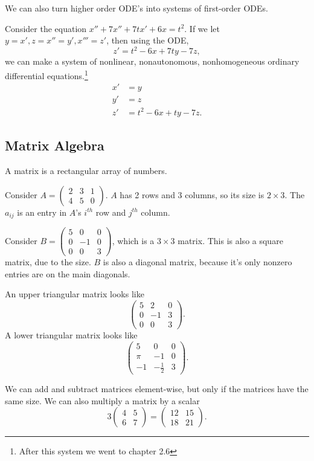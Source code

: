 We can also turn higher order ODE's into systems of first-order ODEs.
\begin{eg}
  Consider the equation $x''+7x''+7tx'+6x=t^2$. If we let $y=x',z=x''=y',x'''=z'$, then using the ODE,
  \[
  z'=t^2-6x+7ty-7z
  ,\]
  we can make a system of nonlinear, nonautonomous, nonhomogeneous ordinary differential equations.\footnote{After this system we went to chapter 2.6}
  \begin{align*}
    x'&=y\\
    y'&=z\\
    z'&=t^2-6x+ty-7z
  .\end{align*}
\subsection{Matrix Algebra}
A matrix is a rectangular array of numbers. 
\begin{eg}
  Consider $A=\begin{pmatrix} 2&3&1\\4&5&0 \end{pmatrix} $. $A$ has 2 rows and 3 columns, so its size is $2\times 3$. The $a_{ij}$ is an entry in $A$'s $i^{th}$ row and $j^{th}$ column.
\end{eg}
\begin{eg}
  Consider $B=\begin{pmatrix} 5&0&0\\0&-1&0\\0&0&3 \end{pmatrix} $, which is a $3\times 3$ matrix. This is also a square matrix, due to the size. $B$ is also a diagonal matrix, because it's only nonzero entries are on the main diagonals.
\end{eg}
An upper triangular matrix looks like 
\[
  \begin{pmatrix} 5&2&0\\0&-1&3\\0&0&3 \end{pmatrix} 
.\] 
A lower triangular matrix looks like
\[
  \begin{pmatrix} 5&0&0\\ \pi&-1&0\\-1&-\frac{1}{2}&3 \end{pmatrix} 
.\] 
\end{eg}
We can add and subtract matrices element-wise, but only if the matrices have the same size. We can also multiply a matrix by a scalar
\[
  3\begin{pmatrix} 4&5\\6&7 \end{pmatrix} =\begin{pmatrix} 12&15\\18&21 \end{pmatrix} 
.\] 
